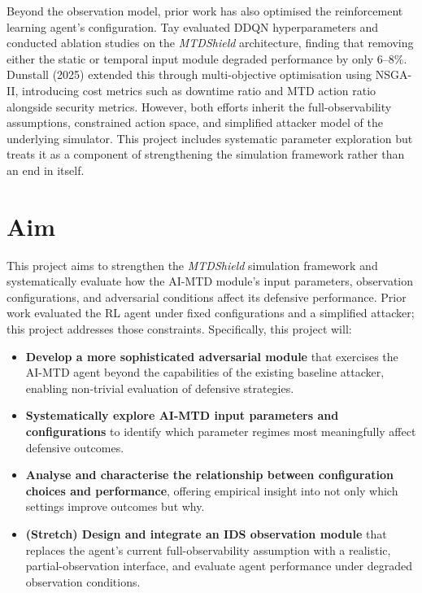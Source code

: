 \documentclass[11pt, a4paper]{article}
\begin{document}
Beyond the observation model, prior work has also optimised the reinforcement learning agent's configuration. Tay \cite{tay2024} evaluated DDQN hyperparameters and conducted ablation studies on the \textit{MTDShield} architecture, finding that removing either the static or temporal input module degraded performance by only 6--8\%. Dunstall (2025) \cite{dunstall2025} extended this through multi-objective optimisation using NSGA-II, introducing cost metrics such as downtime ratio and MTD action ratio alongside security metrics. However, both efforts inherit the full-observability assumptions, constrained action space, and simplified attacker model of the underlying simulator. This project includes systematic parameter exploration but treats it as a component of strengthening the simulation framework rather than an end in itself.

\section{Aim} 

This project aims to strengthen the \textit{MTDShield} simulation framework \cite{zhang2023, tay2024, dunstall2025} and systematically evaluate how the AI-MTD module's input parameters, observation configurations, and adversarial conditions affect its defensive performance. Prior work evaluated the RL agent under fixed configurations and a simplified attacker; this project addresses those constraints. Specifically, this project will:

\begin{itemize}
    \item \textbf{Develop a more sophisticated adversarial module} that exercises the AI-MTD agent beyond the capabilities of the existing baseline attacker, enabling non-trivial evaluation of defensive strategies.

    \item \textbf{Systematically explore AI-MTD input parameters and configurations} to identify which parameter regimes most meaningfully affect defensive outcomes.

    \item \textbf{Analyse and characterise the relationship between configuration choices and performance}, offering empirical insight into not only which settings improve outcomes but why.

    \item \textbf{(Stretch) Design and integrate an IDS observation module} that replaces the agent's current full-observability assumption with a realistic, partial-observation interface, and evaluate agent performance under degraded observation conditions.
    
\end{itemize}
\end{document}
